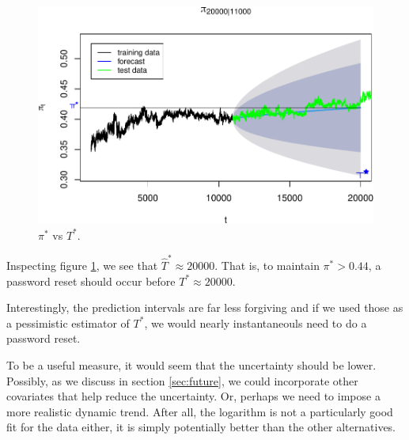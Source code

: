 \documentclass[final,
  11pt,
]{article}
\begin{document}
\begin{figure}
    \includegraphics{Tstar.pdf}
    \caption{$\pi^*$ vs $T^*$.}
    \label{fig:tstar}%
\end{figure}

Inspecting figure \ref{fig:tstar}, we see that $\hat{T}^* \approx 20000$.
That is, to maintain $\pi^* > 0.44$, a password reset should occur
before $T^* \approx 20000$.

Interestingly, the prediction intervals are far less forgiving and
if we used those as a pessimistic estimator of $T^*$, we would
nearly instantaneouls need to do a password reset.

To be a useful measure, it would seem that the uncertainty should be
lower.
Possibly, as we discuss in section \ref{sec:future}, we could
incorporate other covariates that help reduce the uncertainty.
Or, perhaps we need to impose a more realistic dynamic trend.
After all, the logarithm is not a particularly good fit for the
data either, it is simply potentially better than the other
alternatives.





\end{document}
